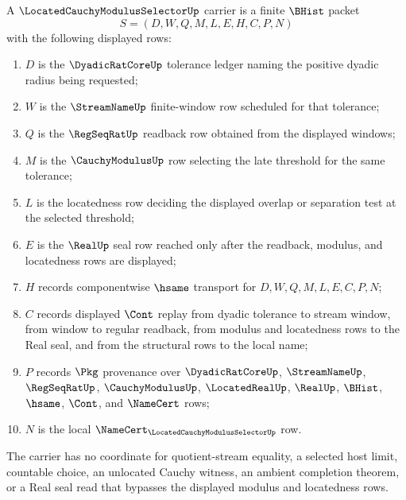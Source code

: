 \begin{definition}
\label{def:located-cauchy-modulus-selector-carrier}
A $\LocatedCauchyModulusSelectorUp$ carrier is a finite $\BHist$ packet
$$
S=(D,W,Q,M,L,E,H,C,P,N)
$$
with the following displayed rows:
\begin{enumerate}
\item $D$ is the $\DyadicRatCoreUp$ tolerance ledger naming the positive dyadic radius being requested;
\item $W$ is the $\StreamNameUp$ finite-window row scheduled for that tolerance;
\item $Q$ is the $\RegSeqRatUp$ readback row obtained from the displayed windows;
\item $M$ is the $\CauchyModulusUp$ row selecting the late threshold for the same tolerance;
\item $L$ is the locatedness row deciding the displayed overlap or separation test at the selected threshold;
\item $E$ is the $\RealUp$ seal row reached only after the readback, modulus, and locatedness rows are displayed;
\item $H$ records componentwise $\hsame$ transport for $D,W,Q,M,L,E,C,P,N$;
\item $C$ records displayed $\Cont$ replay from dyadic tolerance to stream window, from window to regular readback, from modulus and locatedness rows to the Real seal, and from the structural rows to the local name;
\item $P$ records $\Pkg$ provenance over $\DyadicRatCoreUp$, $\StreamNameUp$, $\RegSeqRatUp$, $\CauchyModulusUp$, $\LocatedRealUp$, $\RealUp$, $\BHist$, $\hsame$, $\Cont$, and $\NameCert$ rows;
\item $N$ is the local $\NameCert_{\LocatedCauchyModulusSelectorUp}$ row.
\end{enumerate}
The carrier has no coordinate for quotient-stream equality, a selected host limit, countable choice, an unlocated Cauchy witness, an ambient completion theorem, or a Real seal read that bypasses the displayed modulus and locatedness rows.
\end{definition}

